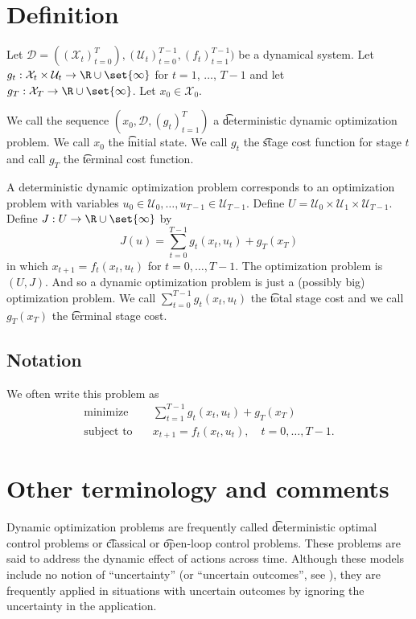 

\section*{Definition}

Let $\mathcal{D}  = ((\mathcal{X} _t)_{t = 0}^{T}), (\mathcal{U} _t)_{t=0}^{T-1}, (f_t)_{t=1}^{T-1})$ be a dynamical system.
Let $g_t: \mathcal{X} _t \times  \mathcal{U} _t \to \R  \cup \set{\infty}$ for $t = 1$, $\dots $, $T-1$ and let $g_{T}: \mathcal{X} _T \to \R  \cup \set{\infty}$.
Let $x_0 \in \mathcal{X} _0$.

We call the sequence $(x_0, \mathcal{D} , (g_t)_{t = 1}^{T})$ a \t{deterministic dynamic optimization problem}.
We call $x_0$ the \t{initial state}.
We call $g_t$ the \t{stage cost function} for stage $t$ and call $g_T$ the \t{terminal cost function}.

A deterministic dynamic optimization problem corresponds to an optimization problem with variables $u_0 \in \mathcal{U} _0, \dots , u_{T-1} \in \mathcal{U} _{T-1}$.
Define $U = \mathcal{U} _0 \times  \mathcal{U} _1 \times \mathcal{U} _{T-1}$.
Define $J: U \to \R  \cup \set{\infty}$ by
\[
J(u) = \sum_{t = 0}^{T-1} g_t(x_t, u_t) + g_T(x_T)
\]
in which $x_{t+1} = f_t(x_t, u_t)$ for $t = 0, \dots , T-1$.
The optimization problem is $(U, J)$.
And so a dynamic optimization problem is just a (possibly big) optimization problem.
We call $\sum_{t = 0}^{T-1} g_t(x_t, u_t)$ the \t{total stage cost} and we call $g_T(x_T)$ the \t{terminal stage cost}.

\subsection*{Notation}

We often write this problem as
\[
\begin{aligned}
\text{minimize}\quad & \sum_{t = 1}^{T-1} g_t(x_t, u_t) + g_T(x_T) \\
\text{subject to}\quad & x_{t+1} = f_t(x_t, u_t), \quad t = 0, \dots , T-1.
\end{aligned}
\]

\section*{Other terminology and comments}

Dynamic optimization problems are frequently called \t{deterministic optimal control} problems or \t{classical} or \t{open-loop control} problems.
These problems are said to address the dynamic effect of actions across time.
Although these models include no notion of ``uncertainty'' (or ``uncertain outcomes'', see ), they are frequently applied in situations with uncertain outcomes by ignoring the uncertainty in the application.
